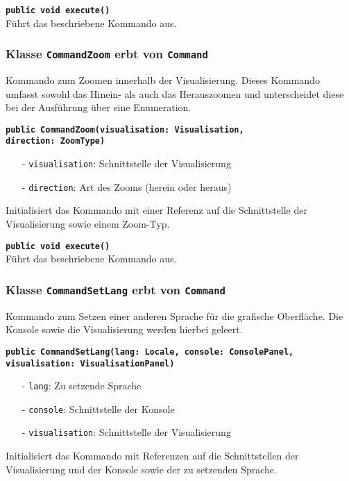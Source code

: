 \documentclass[parskip=full,11pt,twoside]{scrartcl}
\begin{document}
\textbf{\texttt{public void execute()}}\\
Führt das beschriebene Kommando aus.

\subsubsection{Klasse \texttt{CommandZoom} erbt von \texttt{Command}}
Kommando zum Zoomen innerhalb der Visualisierung. Dieses Kommando umfasst sowohl das Hinein- als auch das Herauszoomen und unterscheidet diese bei der Ausführung über eine Enumeration.

\textbf{\texttt{public CommandZoom(visualisation: Visualisation,\\direction: ZoomType)}}\\
\begin{itemize}[noitemsep]
	\item[-] \texttt{visualisation}: Schnittstelle der Visualisierung
	\item[-] \texttt{direction}: Art des Zooms (herein oder heraus)
\end{itemize}
Initialisiert das Kommando mit einer Referenz auf die Schnittstelle der Visualisierung sowie einem Zoom-Typ.

\textbf{\texttt{public void execute()}}\\
Führt das beschriebene Kommando aus.

\subsubsection{Klasse \texttt{CommandSetLang} erbt von \texttt{Command}}
Kommando zum Setzen einer anderen Sprache für die grafische Oberfläche. Die Konsole sowie die Visualisierung werden hierbei geleert.

\textbf{\texttt{public CommandSetLang(lang: Locale, console: ConsolePanel,\\visualisation: VisualisationPanel)}}\\
\begin{itemize}[noitemsep]
	\item[-] \texttt{lang}: Zu setzende Sprache
	\item[-] \texttt{console}: Schnittstelle der Konsole
	\item[-] \texttt{visualisation}: Schnittstelle der Visualisierung
\end{itemize}
Initialisiert das Kommando mit Referenzen auf die Schnittstellen der Visualisierung und der Konsole sowie der zu setzenden Sprache.
\end{document}
